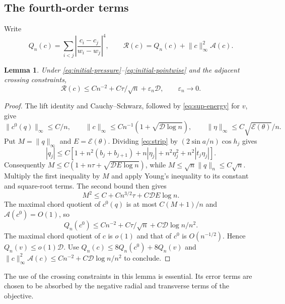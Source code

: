 \documentclass[11pt,reqno]{amsart}
\numberwithin{equation}{section}
\newtheorem{lemma}[theorem]{Lemma}
\theoremstyle{definition}
\theoremstyle{remark}
\newcommand{\A}{\mathcal A}
\newcommand{\E}{\mathcal E}
\newcommand{\norm}[1]{\lVert #1\rVert}
\begin{document}
\subsection{The fourth-order terms}
Write
\[
 Q_n(c)=\sum_{i<j}\left|\frac{c_i-c_j}{w_i-w_j}\right|^4,\qquad
 \mathcal R(c)=Q_n(c)+\norm c_\infty^2\A(c).
\]
\begin{lemma}\label{lem:quartic}
Under \eqref{eq:initial-pressure}--\eqref{eq:initial-pointwise} and the adjacent crossing constraints,
\begin{equation}\label{eq:quartic}
 \mathcal R(c)\le Cn^{-2}+C\tau/\sqrt n+\varepsilon_n\mathscr D,
 \qquad\varepsilon_n\longrightarrow0.
\end{equation}
\end{lemma}
\begin{proof}
The lift identity and Cauchy--Schwarz, followed by \eqref{eq:sup-energy} for $v$, give
\[
 \norm{c^0(q)}_\infty\le C/n,\qquad
 \norm c_\infty\le Cn^{-1}(1+\sqrt{\mathscr D\log n}),\qquad
 \norm\eta_\infty\le C\sqrt{\E(\theta)}/n.
\]
Put $M=\norm q_\infty$ and $E=\E(\theta)$. Dividing \eqref{eq:strip} by $(2\sin a/n)\cos h_j$ gives
\[
 |q_j|\le C[1+n^2(b_j+b_{j+1})+n|\eta_j|+n^2\eta_j^2+n^2|t_j\eta_j|].
\]
Consequently $M\le C(1+n\tau+\sqrt{\mathscr D E\log n})$, while $M\le\sqrt n\norm q_n\le C\sqrt n$. Multiply the first inequality by $M$ and apply Young's inequality to its constant and square-root terms. The second bound then gives
\[
 M^2\le C+Cn^{3/2}\tau+C\mathscr D E\log n.
\]
The maximal chord quotient of $c^0(q)$ is at most $C(M+1)/n$ and $\A(c^0)=O(1)$, so
\[
 Q_n(c^0)\le Cn^{-2}+C\tau/\sqrt n+C\mathscr D\log n/n^2.
\]
The maximal chord quotient of $c$ is $o(1)$ and that of $c^0$ is $O(n^{-1/2})$. Hence $Q_n(v)\le o(1)\mathscr D$. Use $Q_n(c)\le8Q_n(c^0)+8Q_n(v)$ and
$\norm c_\infty^2\A(c)\le Cn^{-2}+C\mathscr D\log n/n^2$ to conclude.
\end{proof}
The use of the crossing constraints in this lemma is essential. Its error terms are chosen to be absorbed by the negative radial and transverse terms of the objective.
\end{document}
